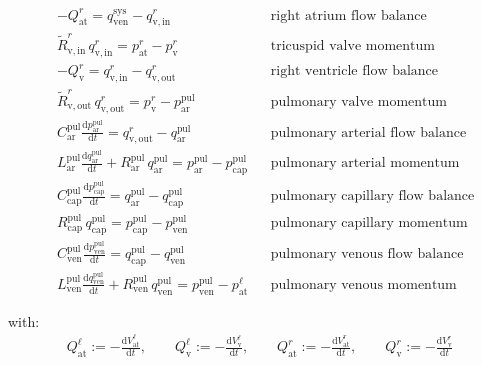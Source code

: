 \documentclass[a4paper,12pt]{report}
\begin{document}
\begin{align}
&-Q_{\mathrm{at}}^{r} = q_{\mathrm{ven}}^{\mathrm{sys}} - q_{\mathrm{v,in}}^{r} && \text{right atrium flow balance}\nonumber\\
&\tilde{R}_{\mathrm{v,in}}^{r}\,q_{\mathrm{v,in}}^{r} = p_{\mathrm{at}}^{r}-p_{\mathrm{v}}^{r} && \text{tricuspid valve momentum}\nonumber\\
&-Q_{\mathrm{v}}^{r} = q_{\mathrm{v,in}}^{r} - q_{\mathrm{v,out}}^{r} && \text{right ventricle flow balance}\nonumber\\
&\tilde{R}_{\mathrm{v,out}}^{r}\,q_{\mathrm{v,out}}^{r} = p_{\mathrm{v}}^{r}-p_{\mathrm{ar}}^{\mathrm{pul}} && \text{pulmonary valve momentum}\nonumber\\
&C_{\mathrm{ar}}^{\mathrm{pul}} \frac{\mathrm{d}p_{\mathrm{ar}}^{\mathrm{pul}}}{\mathrm{d}t} = q_{\mathrm{v,out}}^{r} - q_{\mathrm{ar}}^{\mathrm{pul}} && \text{pulmonary arterial flow balance}\nonumber\\
&L_{\mathrm{ar}}^{\mathrm{pul}}\frac{\mathrm{d}q_{\mathrm{ar}}^{\mathrm{pul}}}{\mathrm{d}t} + R_{\mathrm{ar}}^{\mathrm{pul}}\,q_{\mathrm{ar}}^{\mathrm{pul}}=p_{\mathrm{ar}}^{\mathrm{pul}} -p_{\mathrm{cap}}^{\mathrm{pul}} && \text{pulmonary arterial momentum}\nonumber\\
&C_{\mathrm{cap}}^{\mathrm{pul}} \frac{\mathrm{d}p_{\mathrm{cap}}^{\mathrm{pul}}}{\mathrm{d}t} = q_{\mathrm{ar}}^{\mathrm{pul}} - q_{\mathrm{cap}}^{\mathrm{pul}} && \text{pulmonary capillary flow balance}\nonumber\\
&R_{\mathrm{cap}}^{\mathrm{pul}}\,q_{\mathrm{cap}}^{\mathrm{pul}}=p_{\mathrm{cap}}^{\mathrm{pul}}-p_{\mathrm{ven}}^{\mathrm{pul}} && \text{pulmonary capillary momentum}\nonumber\\
&C_{\mathrm{ven}}^{\mathrm{pul}} \frac{\mathrm{d}p_{\mathrm{ven}}^{\mathrm{pul}}}{\mathrm{d}t} = q_{\mathrm{cap}}^{\mathrm{pul}} - q_{\mathrm{ven}}^{\mathrm{pul}} && \text{pulmonary venous flow balance}\nonumber\\
&L_{\mathrm{ven}}^{\mathrm{pul}}\frac{\mathrm{d}q_{\mathrm{ven}}^{\mathrm{pul}}}{\mathrm{d}t} + R_{\mathrm{ven}}^{\mathrm{pul}}\, q_{\mathrm{ven}}^{\mathrm{pul}}=p_{\mathrm{ven}}^{\mathrm{pul}}-p_{\mathrm{at}}^{\ell} && \text{pulmonary venous momentum}\nonumber
\end{align}

with:
\begin{align}
Q_{\mathrm{at}}^{\ell} := -\frac{\mathrm{d}V_{\mathrm{at}}^{\ell}}{\mathrm{d}t}, \qquad
Q_{\mathrm{v}}^{\ell} := -\frac{\mathrm{d}V_{\mathrm{v}}^{\ell}}{\mathrm{d}t}, \qquad
Q_{\mathrm{at}}^{r} := -\frac{\mathrm{d}V_{\mathrm{at}}^{r}}{\mathrm{d}t}, \qquad
Q_{\mathrm{v}}^{r} := -\frac{\mathrm{d}V_{\mathrm{v}}^{r}}{\mathrm{d}t}\nonumber
\end{align}
\end{document}

